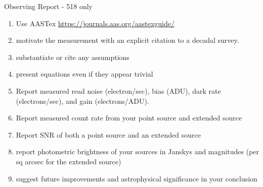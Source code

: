 \begin{frame}{Observing Report - 518 only}
 \begin{enumerate}
 \item Use AASTex \url{https://journals.aas.org/aastexguide/} 
 \item motivate the measurement with an explicit citation to a decadal survey.
 \item substantiate or cite any assumptions
 \item present equations even if they appear trivial
\item Report measured read noise (electron/sec), bias (ADU), dark rate (electrons/sec), and gain (electrons/ADU).
\item Report measured count rate from your point source and extended source
\item Report SNR of both a point source and an extended source
\item report photometric brightness of your sources in Janskys and magnitudes (per sq arcsec for the extended source)
\item suggest future improvements and astrophysical significance in your conclusion
\end{enumerate}
\end{frame}